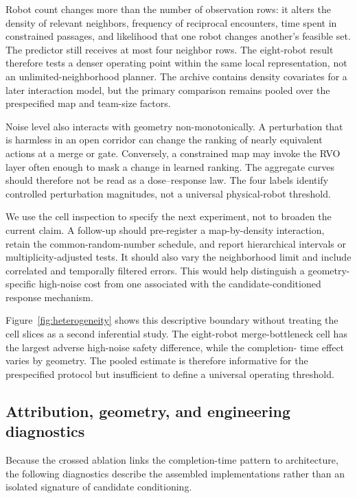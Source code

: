 \documentclass[pdflatex,sn-mathphys-num]{sn-jnl}
\begin{document}
Robot count changes more than the number of observation rows: it alters the density of relevant neighbors, frequency of reciprocal encounters, time spent in constrained passages, and likelihood that one robot changes another's feasible set. The predictor still receives at most four neighbor rows. The eight-robot result therefore tests a denser operating point within the same local representation, not an unlimited-neighborhood planner. The archive contains density covariates for a later interaction model, but the primary comparison remains pooled over the prespecified map and team-size factors.

Noise level also interacts with geometry non-monotonically. A perturbation that is harmless in an open corridor can change the ranking of nearly equivalent actions at a merge or gate. Conversely, a constrained map may invoke the RVO layer often enough to mask a change in learned ranking. The aggregate curves should therefore not be read as a dose--response law. The four labels identify controlled perturbation magnitudes, not a universal physical-robot threshold.

We use the cell inspection to specify the next experiment, not to broaden the current claim. A follow-up should pre-register a map-by-density interaction, retain the common-random-number schedule, and report hierarchical intervals or multiplicity-adjusted tests. It should also vary the neighborhood limit and include correlated and temporally filtered errors. This would help distinguish a geometry-specific high-noise cost from one associated with the candidate-conditioned response mechanism.

Figure~\ref{fig:heterogeneity} shows this descriptive boundary without treating
the cell slices as a second inferential study. The eight-robot merge-bottleneck
cell has the largest adverse high-noise safety difference, while the completion-
time effect varies by geometry. The pooled estimate is therefore informative
for the prespecified protocol but insufficient to define a universal operating
threshold.

\subsection{Attribution, geometry, and engineering diagnostics}

Because the crossed ablation links the completion-time pattern to architecture, the following diagnostics describe the assembled implementations rather than an isolated signature of candidate conditioning.
\end{document}
